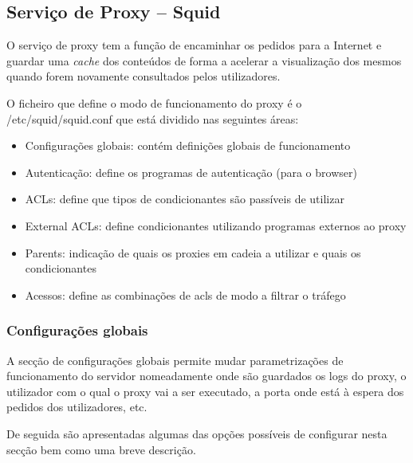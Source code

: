 \subsection{Serviço de Proxy -- Squid}

O serviço de proxy tem a função de encaminhar os pedidos para a
Internet e guardar uma \emph{cache} dos conteúdos de forma a acelerar a
visualização dos mesmos quando forem novamente consultados pelos
utilizadores.

O ficheiro que define o modo de funcionamento do proxy é o /etc/squid/squid.conf
que está dividido nas seguintes áreas:

\begin{itemize}
\item Configurações globais: contém definições globais de
funcionamento

\item Autenticação: define os programas de autenticação (para o browser)

\item ACLs: define que tipos de condicionantes são passíveis de utilizar

\item External ACLs: define condicionantes utilizando programas externos
ao proxy

\item Parents: indicação de quais os proxies em cadeia a utilizar e quais
os condicionantes

\item Acessos: define as combinações de acls de modo a filtrar o tráfego
\end{itemize}

\subsubsection{Configurações globais}

A secção de configurações globais permite mudar
parametrizações de funcionamento do servidor nomeadamente onde
são guardados os logs do proxy, o utilizador com o qual o proxy vai a
ser executado, a porta onde está à espera dos pedidos dos
utilizadores, etc.

De seguida são apresentadas algumas das opções possíveis de
configurar nesta secção bem como uma breve descrição.



